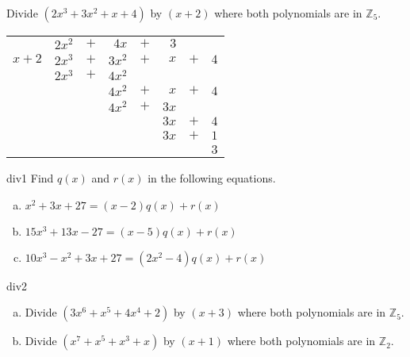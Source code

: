 \begin{example}\label{example:poly:poly_division} 
Divide $(2x^3+3x^2+x+4)$ by $(x+2)$ where  both polynomials are in $\mathbb{Z}_5$.
\begin{center}
\begin{tabular}{rrcrcrcr}
        &  $2x^2$  &  $+$  &      $4x$  &  $+$  &    $3$  &       &       \\ \cline{2-8}
 \multicolumn{1}{r|}{$x + 2$}
        &  $2x^3$  &  $+$  &    $3x^2$  &  $+$  & $ x$  &  $+$  &  $4$  \\
        &  $2x^3$  &  $+$  &    $4 x^2$  &       &         &       &       \\ \cline{2-8}
        &         &       &                $4x^2$  & $+$  &  $ x$  &  $+$  &  $4$  \\
        &         &       &                $4x^2$  &  $+$  & $ 3x$  &       &       \\ \cline{4-8}
        &         &       &           &       &                         $3 x$  & $+$  & $4$  \\
        &         &       &           &       &                          $3x$  & $+$  & $1$  \\ \cline{6-8}
        &         &       &           &       &         &       &                               $3$
\end{tabular}
\end{center}
\end{example}


\begin {exercise}{div1}
Find $q(x)$ and $r(x)$ in the following equations.
\begin {enumerate} [(a)]
\item $x^2+3x+27=(x-2)q(x) + r(x)$
\item $15x^3+13x-27=(x-5)q(x) + r(x)$
\item $10x^3 - x^2+3x+27=(2x^2-4)q(x) + r(x)$
\end {enumerate}
\end {exercise}

\begin {exercise}{div2}
\begin {enumerate} [(a)]
\item Divide  $ ( 3x^6 + x^5 +4x^4 +2)$  by $ ( x+3) $ where both polynomials are in  $\mathbb{Z}_5$.
\item Divide $ (x^7 + x^5 + x^3 + x)$  by $ ( x + 1 ) $ where both polynomials are in $ \mathbb{Z}_2$.
\end {enumerate}
\end {exercise}


